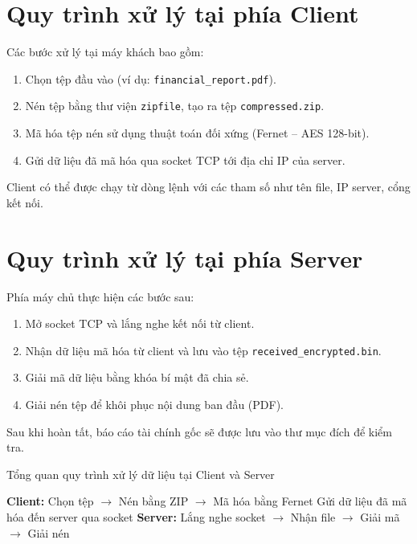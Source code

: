 \section{Quy trình xử lý tại phía Client}

Các bước xử lý tại máy khách bao gồm:

\begin{enumerate}
  \item Chọn tệp đầu vào (ví dụ: \texttt{financial\_report.pdf}).
  \item Nén tệp bằng thư viện \texttt{zipfile}, tạo ra tệp \texttt{compressed.zip}.
  \item Mã hóa tệp nén sử dụng thuật toán đối xứng (Fernet – AES 128-bit).
  \item Gửi dữ liệu đã mã hóa qua socket TCP tới địa chỉ IP của server.
\end{enumerate}

Client có thể được chạy từ dòng lệnh với các tham số như tên file, IP server, cổng kết nối.

\section{Quy trình xử lý tại phía Server}

Phía máy chủ thực hiện các bước sau:

\begin{enumerate}
  \item Mở socket TCP và lắng nghe kết nối từ client.
  \item Nhận dữ liệu mã hóa từ client và lưu vào tệp \texttt{received\_encrypted.bin}.
  \item Giải mã dữ liệu bằng khóa bí mật đã chia sẻ.
  \item Giải nén tệp để khôi phục nội dung ban đầu (PDF).
\end{enumerate}

Sau khi hoàn tất, báo cáo tài chính gốc sẽ được lưu vào thư mục đích để kiểm tra.

\begin{algorithm}[H]
\caption{Tổng quan quy trình xử lý dữ liệu tại Client và Server}
\begin{algorithmic}[1]
\State \textbf{Client:}
\State Chọn tệp $\rightarrow$ Nén bằng ZIP $\rightarrow$ Mã hóa bằng Fernet
\State Gửi dữ liệu đã mã hóa đến server qua socket
\Statex
\State \textbf{Server:}
\State Lắng nghe socket $\rightarrow$ Nhận file $\rightarrow$ Giải mã $\rightarrow$ Giải nén
\end{algorithmic}
\end{algorithm}



